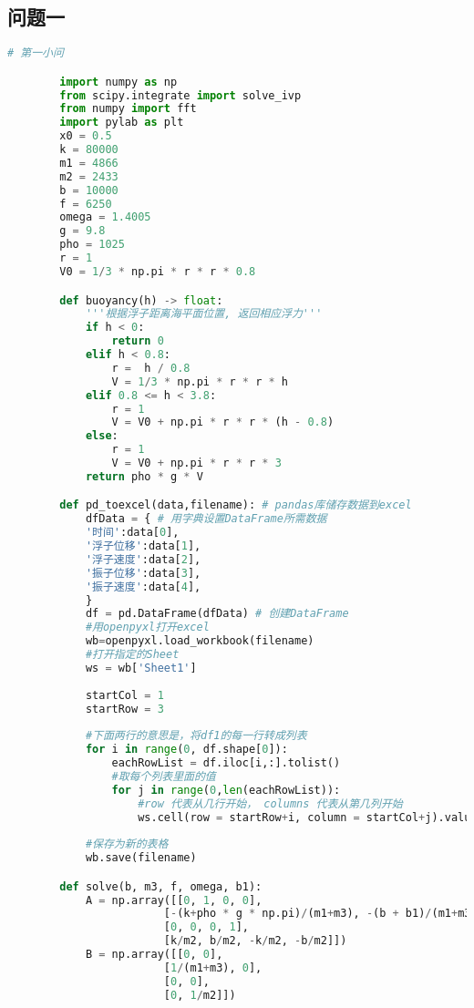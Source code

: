 \documentclass[withoutpreface,bwprint]{cumcmthesis} %
\begin{document}
    \newpage
    \begin{appendices}
        \section{问题一}

        \begin{lstlisting}[language=python]
        # 第一小问

        import numpy as np
        from scipy.integrate import solve_ivp
        from numpy import fft
        import pylab as plt
        x0 = 0.5
        k = 80000
        m1 = 4866
        m2 = 2433
        b = 10000
        f = 6250
        omega = 1.4005
        g = 9.8
        pho = 1025
        r = 1
        V0 = 1/3 * np.pi * r * r * 0.8

        def buoyancy(h) -> float:
            '''根据浮子距离海平面位置, 返回相应浮力'''
            if h < 0:
                return 0
            elif h < 0.8:
                r =  h / 0.8
                V = 1/3 * np.pi * r * r * h
            elif 0.8 <= h < 3.8:
                r = 1
                V = V0 + np.pi * r * r * (h - 0.8)
            else:
                r = 1
                V = V0 + np.pi * r * r * 3
            return pho * g * V

        def pd_toexcel(data,filename): # pandas库储存数据到excel
            dfData = { # 用字典设置DataFrame所需数据
            '时间':data[0],
            '浮子位移':data[1],
            '浮子速度':data[2],
            '振子位移':data[3],
            '振子速度':data[4],
            }
            df = pd.DataFrame(dfData) # 创建DataFrame
            #用openpyxl打开excel
            wb=openpyxl.load_workbook(filename)
            #打开指定的Sheet
            ws = wb['Sheet1']
            
            startCol = 1
            startRow = 3
            
            #下面两行的意思是，将df1的每一行转成列表
            for i in range(0, df.shape[0]):
                eachRowList = df.iloc[i,:].tolist()
                #取每个列表里面的值
                for j in range(0,len(eachRowList)):
                    #row 代表从几行开始， columns 代表从第几列开始
                    ws.cell(row = startRow+i, column = startCol+j).value =eachRowList[j]
            
            #保存为新的表格
            wb.save(filename)

        def solve(b, m3, f, omega, b1):
            A = np.array([[0, 1, 0, 0], 
                        [-(k+pho * g * np.pi)/(m1+m3), -(b + b1)/(m1+m3), k/(m1+m3), b/(m1+m3)], 
                        [0, 0, 0, 1], 
                        [k/m2, b/m2, -k/m2, -b/m2]])
            B = np.array([[0, 0], 
                        [1/(m1+m3), 0], 
                        [0, 0],
                        [0, 1/m2]])


\end{lstlisting}
\end{appendices}
\end{document}
